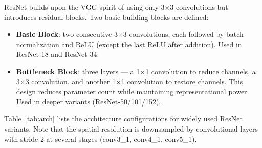 \documentclass[11pt,a4paper]{article}
\begin{document}
ResNet builds upon the VGG spirit of using only 3×3 convolutions but introduces residual blocks. Two basic building blocks are defined:
\begin{itemize}
    \item \textbf{Basic Block}: two consecutive 3×3 convolutions, each followed by batch normalization and ReLU (except the last ReLU after addition). Used in ResNet-18 and ResNet-34.
    \item \textbf{Bottleneck Block}: three layers — a 1×1 convolution to reduce channels, a 3×3 convolution, and another 1×1 convolution to restore channels. This design reduces parameter count while maintaining representational power. Used in deeper variants (ResNet-50/101/152).
\end{itemize}

Table~\ref{tab:arch} lists the architecture configurations for widely used ResNet variants. Note that the spatial resolution is downsampled by convolutional layers with stride 2 at several stages (conv3\_1, conv4\_1, conv5\_1).
\end{document}
